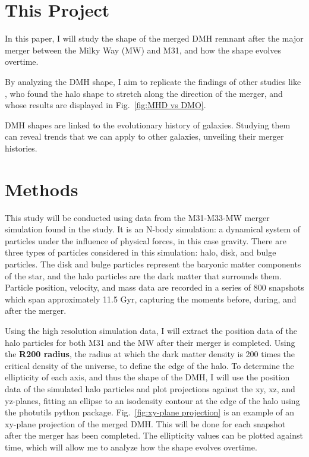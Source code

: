 \documentclass[fleqn,usenatbib]{mnras}
\begin{document}
\section{This Project}

In this paper, I will study the shape of the merged DMH remnant after the major merger between the Milky Way (MW) and M31, and how the shape evolves overtime.  

By analyzing the DMH shape, I aim to replicate the findings of other studies like \citet{Drakos_2019}, who found the halo shape to stretch along the direction of the merger, and \citet{Prada_2019} whose results are displayed in Fig.~\ref{fig:MHD vs DMO}.

DMH shapes are linked to the evolutionary history of galaxies. Studying them can reveal trends that we can apply to other galaxies, unveiling their merger histories.



\section{Methods}

This study will be conducted using data from the M31-M33-MW merger simulation found in the \citet{van_der_Marel_2012} study. It is an N-body simulation: a dynamical system of particles under the influence of physical forces, in this case gravity. There are three types of particles considered in this simulation: halo, disk, and bulge particles. The disk and bulge particles represent the baryonic matter components of the star, and the halo particles are the dark matter that surrounds them. Particle position, velocity, and mass data are recorded in a series of 800 snapshots which span approximately 11.5 Gyr, capturing the moments before, during, and after the merger.

Using the high resolution simulation data, I will extract the position data of the halo particles for both M31 and the MW after their merger is completed. Using the \textbf{R200 radius}, the radius at which the dark matter density is 200 times the critical density of the universe, to define the edge of the halo. To determine the ellipticity of each axis, and thus the shape of the DMH, I will use the position data of the simulated halo particles and plot projections against the xy, xz, and yz-planes, fitting an ellipse to an isodensity contour at the edge of the halo using the photutils python package. Fig.~\ref{fig:xy-plane projection} is an example of an xy-plane projection of the merged DMH. This will be done for each snapshot after the merger has been completed. The ellipticity values can be plotted against time, which will allow me to analyze how the shape evolves overtime.
\end{document}
